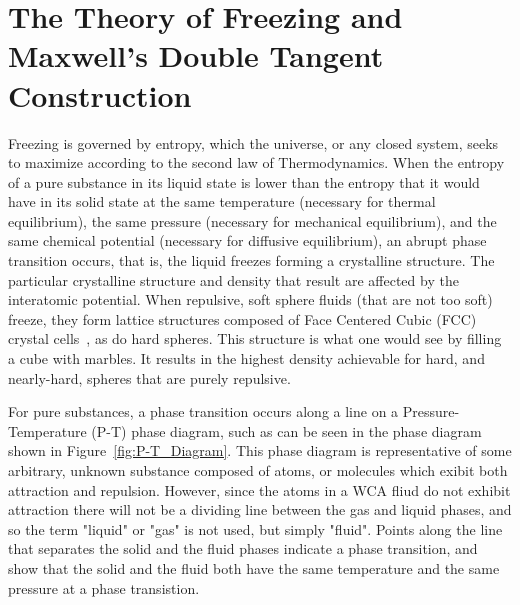 \documentclass[double,12pt]{beavtex}
\begin{document}
\newpage
\section{The Theory of Freezing and Maxwell's Double Tangent Construction}

Freezing is governed by entropy, which the universe, or any closed system, 
seeks to maximize according to the second law of Thermodynamics. When the 
entropy of a pure substance in its liquid state is lower than the entropy 
that it would have in its solid state at the same temperature (necessary 
for thermal equilibrium), the same pressure (necessary for mechanical 
equilibrium), and the same chemical potential (necessary for diffusive 
equilibrium), an abrupt phase transition occurs, that is, the liquid freezes 
forming a crystalline structure. The particular crystalline structure and 
density that result are affected by the interatomic potential. When repulsive, 
soft sphere fluids (that are not too soft) freeze, they form lattice 
structures composed of Face Centered Cubic (FCC) crystal cells~\cite{Hansen}, 
as do hard spheres. 
This structure is what one would see by filling a cube with marbles. It 
results in the highest density achievable for hard, and nearly-hard, spheres 
that are purely repulsive. 

For pure substances, a phase transition occurs along a line on a 
Pressure-Temperature (P-T) phase diagram, such as can be seen in the phase 
diagram shown in Figure~\ref{fig:P-T_Diagram}. This phase diagram is 
representative of some arbitrary, unknown substance composed of atoms, 
or molecules which exibit both attraction and repulsion. However, since 
the atoms in a WCA fliud do not exhibit attraction there will not be a 
dividing line between the gas and liquid phases, and so the term "liquid" 
or "gas" is not used, but simply "fluid". Points along the line that 
separates the solid and the fluid phases indicate a phase transition, 
and show that the solid and the fluid both have the same temperature and 
the same pressure at a phase transistion.
\end{document}
